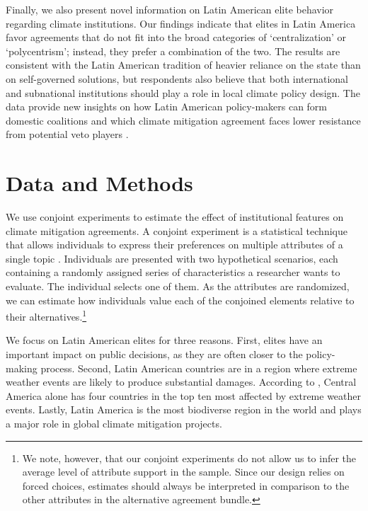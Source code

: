 \documentclass[a4paper,12pt]{article}
\begin{document}
Finally, we also present novel information on Latin American elite behavior regarding climate institutions. Our findings indicate that elites in Latin America favor agreements that do not fit into the broad categories of `centralization' or `polycentrism'; instead, they prefer a combination of the two. The results are consistent with the Latin American tradition of heavier reliance on the state than on self-governed solutions, but respondents also believe that both international and subnational institutions should play a role in local climate policy design. The data provide new insights on how Latin American policy-makers can form domestic coalitions and which climate mitigation agreement faces lower resistance from potential veto players \citep{beiser2019commitment, hovi2019club}.

\section{Data and Methods}%
\label{sec:data_and_methods}

We use conjoint experiments to estimate the effect of institutional features on climate mitigation agreements. A conjoint experiment is a statistical technique that allows individuals to express their preferences on multiple attributes of a single topic \citep{bansak2016economic, hainmueller2014causal}. Individuals are presented with two hypothetical scenarios, each containing a randomly assigned series of characteristics a researcher wants to evaluate. The individual selects one of them. As the attributes are randomized, we can estimate how individuals value each of the conjoined elements relative to their alternatives.\footnote{We note, however, that our conjoint experiments do not allow us to infer the average level of attribute support in the sample. Since our design relies on forced choices, estimates should always be interpreted in comparison to the other attributes in the alternative agreement bundle.} 

We focus on Latin American elites for three reasons. First, elites have an important impact on public decisions, as they are often closer to the policy-making process. Second, Latin American countries are in a region where extreme weather events are likely to produce substantial damages. According to \citet{eckstein2017global}, Central America alone has four countries in the top ten most affected by extreme weather events. Lastly, Latin America is the most biodiverse region in the world and plays a major role in global climate mitigation projects. 
\end{document}
